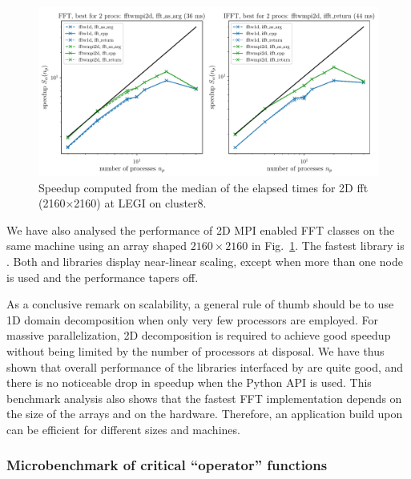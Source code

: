 \documentclass{../jors}
\begin{document}
\begin{figure}[htp!]
\centering
\includegraphics[width=\linewidth]{tmp/fig_legi_cluster8_2160x2160}
\caption{Speedup computed from the median of the elapsed times for 2D fft
(2160$\times$2160) at LEGI on cluster8.}
\label{fig:cluster8:2160x2160}
\end{figure}

We have also analysed the performance of 2D MPI enabled FFT classes on the same
machine using an array shaped $2160\times2160$ in
Fig.~\ref{fig:cluster8:2160x2160}. The fastest library is
. Both  and 
libraries display near-linear scaling, except when more than one node is used
and the performance tapers off.

As a conclusive remark on scalability, a general rule of thumb should be to use
1D domain decomposition when only very few processors are employed. For massive
parallelization, 2D decomposition is required to achieve good speedup without
being limited by the number of processors at disposal. We have thus shown that
overall performance of the libraries interfaced by  are quite
good, and there is no noticeable drop in speedup when the Python API is used.
%
This benchmark analysis also shows that the fastest FFT implementation depends
on the size of the arrays and on the hardware.
%
Therefore, an application build upon  can be efficient for
different sizes and machines.


\subsubsection*{Microbenchmark of critical ``operator'' functions}
\end{document}
